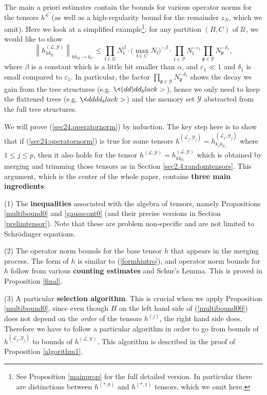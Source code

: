 \documentclass[11 pt,reqno]{amsart}
\theoremstyle{definition}
\theoremstyle{remark}
\numberwithin{equation}{section}
\newcommand{\Lc}{\mathcal{L}}
\newcommand{\Pc}{\mathcal{P}}
\newcommand{\Uc}{\mathcal{U}}
\newcommand{\Yc}{\mathcal{Y}}
\newcommand{\pf}{\mathfrak{p}}
\newcommand{\lf}{\mathfrak{l}}
\begin{document}
{The main a priori estimates contain the bounds for various operator norms for the tensors $h^\Lc$ (as well as a high-regularity bound for the remainder $z_N$, which we omit). Here we look at a simplified example\footnote{See Proposition \ref{mainprop} for the full detailed version. In particular there are distinctions between $h^{(*,0)}$ and $h^{(*,1)}$ tensors, which we omit here.}: for any partition $(B, C)$ of $\Uc$, we would like to show
\begin{equation}\label{sec24:operatornorm}
\left\| h^{(\Lc,\Yc)}_{kk_\Uc}\right\|_{kk_B\to k_C} \leq \prod_{\lf\in \Uc}N_\lf^{\beta}\cdot \big(\max_{\lf\in C}N_\lf\big)^{-\beta}\cdot \prod_{\lf\in \Pc} N_\lf^{-\varepsilon_1} \prod_{\pf\in \Yc} N_\pf^{-\delta_1},
\end{equation}
where $\beta$ is a constant which is a little bit smaller than $\alpha$, and $\varepsilon_1\ll 1$ and $\delta_1$ is small compared to $\varepsilon_1$. In particular, the factor $\prod_{\pf\in \Yc} N_\pf^{-\delta_1}$ shows the decay we gain from the tree structures (e.g. $\<(dd)dd_black>\,$), hence we only need to keep the flattened trees (e.g. $\<dddd_black>$) and the memory set $\Yc$ abstracted from the full tree structures.

We will prove (\ref{sec24:operatornorm}) by induction. The key step here is to show that if (\ref{sec24:operatornorm}) is true for some tensors $h^{(\Lc_j,\Yc_j)}=h_{k_jk_{\Uc_j}}^{(\Lc_j,\Yc_j)}$ where $1\leq j\leq p$, then it also holds for the tensor $h^{(\Lc,\Yc)}=h_{kk_\Uc}^{(\Lc,\Yc)}$ which is obtained by merging and trimming those tensors as in Section \ref{sec2.4:randomtensors}. This argument, which is the center of the whole paper, contains \textbf{three main ingredients}:

(1) The \textbf{inequalities} associated with the algebra of tensors, namely Propositions \ref{multibound0} and \ref{gausscont0} (and their precise versions in Section \ref{prelimtensor}). Note that these are problem non-specific and are not limited to Schr\"{o}dinger equations.

(2) The operator norm bounds for the base tensor $h$ that appears in the merging process. The form of $h$ is similar to (\ref{formhintro}), and operator norm bounds for $h$ follow from various \textbf{counting estimates} and Schur's Lemma. This is proved in Proposition \ref{final}.

(3) A particular \textbf{selection algorithm}. This is crucial when we apply Proposition \ref{multibound0}, since even though $H$ on the left hand side of (\ref{multibound00}) does not depend on the \emph{order} of the tensors $h^{(j)}$, the right hand side does. Therefore we have to follow a particular algorithm in order to go from bounds of $h^{(\Lc_j,\Yc_j)}$ to bounds of $h^{(\Lc,\Yc)}$. This algorithm is described in the proof of Proposition \ref{algorithm1}.

}
\end{document}
